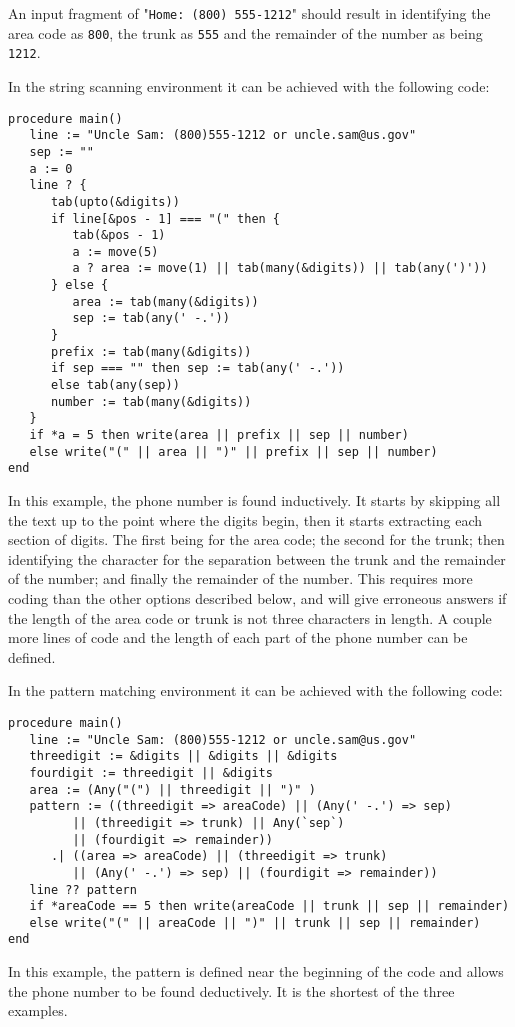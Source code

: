 \documentclass{article}
\begin{document}
An input fragment of "\texttt{Home: (800) 555-1212}" should result in identifying the area code as \texttt{800}, the trunk as \texttt{555} and the remainder of the number as being \texttt{1212}.

In the string scanning environment it can be achieved with the following code:
\begin{verbatim}
procedure main()
   line := "Uncle Sam: (800)555-1212 or uncle.sam@us.gov"
   sep := ""
   a := 0
   line ? {
      tab(upto(&digits))
      if line[&pos - 1] === "(" then {
         tab(&pos - 1)
         a := move(5)
         a ? area := move(1) || tab(many(&digits)) || tab(any(')'))
      } else {
         area := tab(many(&digits))
         sep := tab(any(' -.'))
      } 
      prefix := tab(many(&digits))
      if sep === "" then sep := tab(any(' -.'))
      else tab(any(sep))
      number := tab(many(&digits))
   }
   if *a = 5 then write(area || prefix || sep || number)
   else write("(" || area || ")" || prefix || sep || number)
end
\end{verbatim}
In this example, the phone number is found inductively.  It starts by skipping all the text up to the point where the digits begin, then it starts extracting each section of digits.  The first being for the area code; the second for the trunk; then identifying the character for the separation between the trunk and the remainder of the number; and finally the remainder of the number.  This requires more coding than the other options described below, and will give erroneous answers if the length of the area code or trunk is not three characters in length.  A couple more lines of code and the length of each part of the phone number can be defined.

In the pattern matching environment it can be achieved with the following code:
\begin{verbatim}
procedure main()
   line := "Uncle Sam: (800)555-1212 or uncle.sam@us.gov"
   threedigit := &digits || &digits || &digits
   fourdigit := threedigit || &digits
   area := (Any("(") || threedigit || ")" )
   pattern := ((threedigit => areaCode) || (Any(' -.') => sep) 
         || (threedigit => trunk) || Any(`sep`) 
         || (fourdigit => remainder))
      .| ((area => areaCode) || (threedigit => trunk) 
         || (Any(' -.') => sep) || (fourdigit => remainder))
   line ?? pattern
   if *areaCode == 5 then write(areaCode || trunk || sep || remainder)
   else write("(" || areaCode || ")" || trunk || sep || remainder) 
end
\end{verbatim}
In this example, the pattern is defined near the beginning of the code and allows the phone number to be found deductively.  It is the shortest of the three examples.
\end{document}
